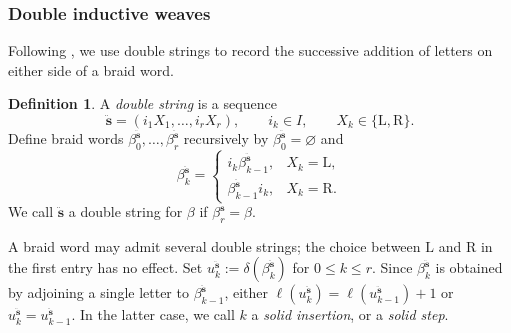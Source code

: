 \documentclass[12pt, reqno]{amsart}
\theoremstyle{plain}
\theoremstyle{definition}
\newtheorem{definition}[theorem]{Definition}
\numberwithin{equation}{section}
\begin{document}
\subsubsection{Double inductive weaves}

Following \cite[Section~6.4]{casals2025cluster}, we use double strings to
record the successive addition of letters on either side of a braid word.

\begin{definition}
    A \emph{double string} is a sequence
    \begin{equation}\label{eq:double-string}
        \ddot{\mathbf{s}}=(i_1X_1,\ldots,i_rX_r),
        \qquad i_k\in I,
        \qquad X_k\in\{\mathrm L,\mathrm R\}.
    \end{equation}
    Define braid words \(\beta^{\ddot{\mathbf{s}}}_0,\ldots,\beta^{\ddot{\mathbf{s}}}_r\) recursively by
    \(\beta^{\ddot{\mathbf{s}}}_0=\varnothing\) and
    \begin{equation}\label{eq:double-string-recursion}
        \beta^{\ddot{\mathbf{s}}}_k=
        \begin{cases}
            i_k\beta^{\ddot{\mathbf{s}}}_{k-1}, & X_k=\mathrm L,\\
            \beta^{\ddot{\mathbf{s}}}_{k-1}i_k, & X_k=\mathrm R.
        \end{cases}
    \end{equation}
    We call \(\ddot{\mathbf{s}}\) a double string for \(\beta\) if
    \(\beta^{\ddot{\mathbf{s}}}_r=\beta\).
\end{definition}

A braid word may admit several double strings; the choice between
\(\mathrm L\) and \(\mathrm R\) in the first entry has no effect. Set
\(u_k^{\ddot{\mathbf{s}}}:=\delta(\beta^{\ddot{\mathbf{s}}}_k)\) for \(0\leq k\leq r\). Since
\(\beta^{\ddot{\mathbf{s}}}_k\) is obtained by adjoining a single letter to
\(\beta_{k-1}^{\ddot{\mathbf{s}}}\), either
\(\ell(u_k^{\ddot{\mathbf{s}}})=\ell(u_{k-1}^{\ddot{\mathbf{s}}})+1\) or
\(u^{\ddot{\mathbf{s}}}_k=u^{\ddot{\mathbf{s}}}_{k-1}\). In the
latter case, we call \(k\) a \emph{solid insertion}, or a
\emph{solid step}.
\end{document}
